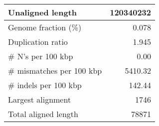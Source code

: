 \documentclass[12pt,a4paper]{article}
\begin{document}
\begin{table}[ht]
\begin{center}
\begin{tabular}{|l*{1}{|r}|}
Unaligned length & 120340232 \\ \hline
Genome fraction (\%) & 0.078 \\ \hline
Duplication ratio & 1.945 \\ \hline
\# N's per 100 kbp & 0.00 \\ \hline
\# mismatches per 100 kbp & 5410.32 \\ \hline
\# indels per 100 kbp & 142.44 \\ \hline
Largest alignment & 1746 \\ \hline
Total aligned length & 78871 \\ \hline
\end{tabular}
\end{center}
\end{table}
\end{document}
